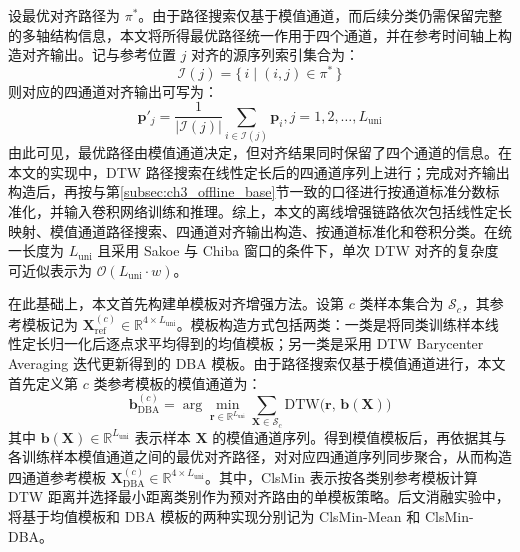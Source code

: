 \documentclass{xdupgthesis}
\begin{document}
设最优对齐路径为 $\pi^\ast$。由于路径搜索仅基于模值通道，而后续分类仍需保留完整的多轴结构信息，本文将所得最优路径统一作用于四个通道，并在参考时间轴上构造对齐输出。记与参考位置 $j$ 对齐的源序列索引集合为：
\begin{equation}
    \mathcal{I}(j)=\{\,i\mid (i,j)\in\pi^\ast\,\}
\end{equation}
则对应的四通道对齐输出可写为：
\begin{equation}
    \mathbf{p}'_j=\frac{1}{|\mathcal{I}(j)|}\sum_{i\in\mathcal{I}(j)}\mathbf{p}_i, j=1,2,\ldots,L_{\mathrm{uni}}
\end{equation}
由此可见，最优路径由模值通道决定，但对齐结果同时保留了四个通道的信息。在本文的实现中，DTW 路径搜索在线性定长后的四通道序列上进行；完成对齐输出构造后，再按与第\ref{subsec:ch3_offline_base}节一致的口径进行按通道标准分数标准化，并输入卷积网络训练和推理。综上，本文的离线增强链路依次包括线性定长映射、模值通道路径搜索、四通道对齐输出构造、按通道标准化和卷积分类。在统一长度为 $L_{\mathrm{uni}}$ 且采用 Sakoe 与 Chiba 窗口的条件下，单次 DTW 对齐的复杂度可近似表示为 $\mathcal{O}(L_{\mathrm{uni}}\cdot w)$。

在此基础上，本文首先构建单模板对齐增强方法。设第 $c$ 类样本集合为 $\mathcal{S}_c$，其参考模板记为 $\mathbf{X}_{\mathrm{ref}}^{(c)}\in\mathbb{R}^{4\times L_{\mathrm{uni}}}$。模板构造方式包括两类：一类是将同类训练样本线性定长归一化后逐点求平均得到的均值模板；另一类是采用 DTW Barycenter Averaging 迭代更新得到的 DBA 模板\cite{ch3_petitjean2011dba}。由于路径搜索仅基于模值通道进行，本文首先定义第 $c$ 类参考模板的模值通道为：
\begin{equation}
    \mathbf{b}_{\mathrm{DBA}}^{(c)}
    =
    \arg\min_{\mathbf{r}\in\mathbb{R}^{L_{\mathrm{uni}}}}
    \sum_{\mathbf{X}\in\mathcal{S}_c}
    \mathrm{DTW}\big(\mathbf{r},\,\mathbf{b}(\mathbf{X})\big)
\end{equation}
其中 $\mathbf{b}(\mathbf{X})\in\mathbb{R}^{L_{\mathrm{uni}}}$ 表示样本 $\mathbf{X}$ 的模值通道序列。得到模值模板后，再依据其与各训练样本模值通道之间的最优对齐路径，对对应四通道序列同步聚合，从而构造四通道参考模板 $\mathbf{X}_{\mathrm{DBA}}^{(c)}\in\mathbb{R}^{4\times L_{\mathrm{uni}}}$。其中，ClsMin 表示按各类别参考模板计算 DTW 距离并选择最小距离类别作为预对齐路由的单模板策略。后文消融实验中，将基于均值模板和 DBA 模板的两种实现分别记为 ClsMin-Mean 和 ClsMin-DBA。
\end{document}

